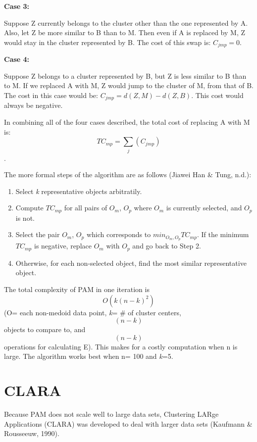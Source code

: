 \documentclass[12pt,twoside]{amherstthesis}
\begin{document}
  \textbf{Case 3:}
  
  Suppose Z currently belongs to the cluster other than the one
  represented by A. Also, let Z be more similar to B than to M. Then even
  if A is replaced by M, Z would stay in the cluster represented by B. The
  cost of this swap is: \(C_{jmp} = 0\).
  
  \textbf{Case 4:}
  
  Suppose Z belongs to a cluster represented by B, but Z is less similar
  to B than to M. If we replaced A with M, Z would jump to the cluster of
  M, from that of B. The cost in this case would be:
  \(C_{jmp} = d(Z, M) - d(Z, B)\). This cost would always be negative.
  
  In combining all of the four cases described, the total cost of
  replacing A with M is: \[ TC_{mp} = \sum_j(C_{jmp}) \].
  
  The more formal steps of the algorithm are as follows (Jiawei Han \&
  Tung, n.d.):
  
  \begin{enumerate}
  \def\labelenumi{\arabic{enumi}.}
  \item
    Select \emph{k} representative objects arbitratily.
  \item
    Compute \(TC_{mp}\) for all pairs of \(O_m\), \(O_p\) where \(O_m\) is
    currently selected, and \(O_p\) is not.
  \item
    Select the pair \(O_m\), \(O_p\) which corresponds to
    \(min_{O_m, O_p} TC_{mp}\). If the minimum \(TC_{mp}\) is negative,
    replace \(O_m\) with \(O_p\) and go back to Step 2.
  \item
    Otherwise, for each non-selected object, find the most similar
    representative object.
  \end{enumerate}
  
  The total complexity of PAM in one iteration is \[O(k(n-k)^2)\] (O= each
  non-medoid data point, \emph{k}= \# of cluster centers, \[(n-k)\]
  objects to compare to, and \[(n-k)\] operations for calculating E). This
  makes for a costly computation when n is large. The algorithm works best
  when n= 100 and \emph{k}=5.
  
  \section{CLARA}\label{clara}
  
  Because PAM does not scale well to large data sets, Clustering LARge
  Applications (CLARA) was developed to deal with larger data sets
  (Kaufmann \& Rousseeuw, 1990).
  
\end{document}
